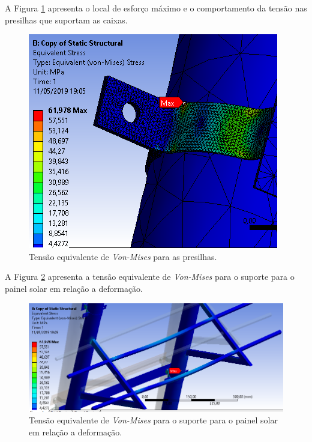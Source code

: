 A Figura \ref{fig:presilha} apresenta o local de esforço máximo e o comportamento da tensão nas presilhas que suportam as caixas.

\begin{figure}[H]
	        \centering
            \includegraphics[scale=0.8]{figuras/tension_presilha.PNG}
            \caption{Tensão equivalente de \textit{Von-Mises} para as presilhas.}
            \label{fig:presilha}
            \end{figure}
            
A Figura \ref{fig:defor_painel} apresenta a tensão equivalente de \textit{Von-Mises} para o suporte para o painel solar em relação a deformação.

            \begin{figure}[H]
	        \centering
            \includegraphics[scale=0.5]{figuras/tensao_relacao_deformacao.PNG}
            \caption{Tensão equivalente de \textit{Von-Mises} para o suporte para o painel solar em relação a deformação.}
            \label{fig:defor_painel}
            \end{figure}
            
